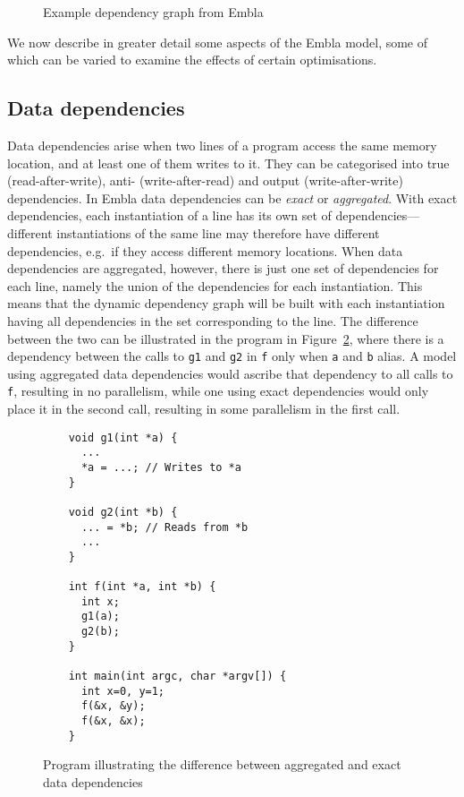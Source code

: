 \begin{figure}
  \begin{center}
  \small
  
  \end{center}
  \nocaptionrule \caption{Example dependency graph from Embla}
  \label{example-depgraph}
\end{figure}

We now describe in greater detail some aspects of the Embla model, some of which can be varied to examine the effects of certain optimisations.

\subsection{Data dependencies}
Data dependencies arise when two lines of a program access the same memory location, and at least one of them writes to it.
They can be categorised into true (read-after-write), anti- (write-after-read) and output (write-after-write) dependencies.
In Embla data dependencies can be \emph{exact} or \emph{aggregated}.
With exact dependencies, each instantiation of a line has its own set of dependencies---different instantiations of the same line may therefore have different dependencies, e.g.\ if they access different memory locations.
When data dependencies are aggregated, however, there is just one set of dependencies for each line, namely the union of the dependencies for each instantiation.
This means that the dynamic dependency graph will be built with each instantiation having all dependencies in the set corresponding to the line.
The difference between the two can be illustrated in the program in Figure~\ref{datadeps}, where there is a dependency between the calls to \texttt{g1} and \texttt{g2} in \texttt{f} only when \texttt{a} and \texttt{b} alias.
A model using aggregated data dependencies would ascribe that dependency to all calls to \texttt{f}, resulting in no parallelism, while one using exact dependencies would only place it in the second call, resulting in some parallelism in the first call.

\begin{figure}
  \begin{center}
  \small
  \begin{verbatim}
    void g1(int *a) {
      ...
      *a = ...; // Writes to *a
    }
  
    void g2(int *b) {
      ... = *b; // Reads from *b
      ...
    }

    int f(int *a, int *b) {
      int x;
      g1(a);
      g2(b);
    }

    int main(int argc, char *argv[]) {
      int x=0, y=1;
      f(&x, &y);
      f(&x, &x);
    }
  \end{verbatim}
  \end{center}
  \caption{Program illustrating the difference between aggregated and exact data dependencies}
  \label{datadeps}
\end{figure}


